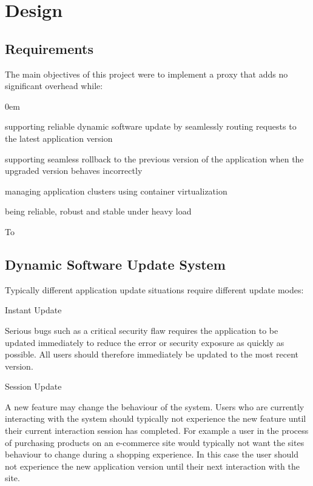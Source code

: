 \documentclass[a4paper,11pt,twoside]{report}
\begin{document}
\clearpage

\chapter{Design}\label{Design}
\section{Requirements}\label{requirements} 

The main objectives of this project were to implement a proxy that adds no significant overhead while:
\begin{list}{-}{}
\itemsep0em
\item supporting reliable dynamic software update by seamlessly routing requests to the latest application version
\item supporting seamless rollback to the previous version of the application when the upgraded version behaves incorrectly  
\item managing application clusters using container virtualization
\item being reliable, robust and stable under heavy load
\end{list}

To 

\section{Dynamic Software Update System}\label{modes} 

Typically different application update situations require different update modes:

Instant Update

Serious bugs such as a critical security flaw requires the application to be updated immediately to reduce the error or security exposure as quickly as possible.  All users should therefore immediately be updated to the most recent version.

Session Update

A new feature may change the behaviour of the system.  Users who are currently interacting with the system should typically not experience the new feature until their current interaction session has completed.  For example a user in the process of purchasing products on an e-commerce site would typically not want the sites behaviour to change during a shopping experience.  In this case the user should not experience the new application version until their next interaction with the site.
\end{document}

